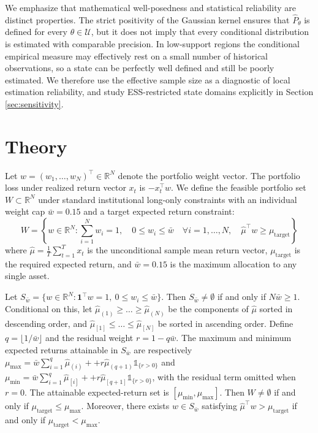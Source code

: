 \documentclass[smallcondensed]{svjour3}
\begin{document}
We emphasize that mathematical well-posedness and statistical reliability are
distinct properties. The strict positivity of the Gaussian kernel ensures that
$\widehat P_\theta$ is defined for every $\theta \in \mathcal{U}$, but it does
not imply that every conditional distribution is estimated with comparable
precision. In low-support regions the conditional empirical measure may
effectively rest on a small number of historical observations, so a state can be
perfectly well defined and still be poorly estimated. We therefore use the
effective sample size as a diagnostic of local estimation reliability, and study
ESS-restricted state domains explicitly in Section \ref{sec:sensitivity}.

\section{Theory}\label{sec:theory}
Let $w = (w_1, \dots, w_N)^\top \in \mathbb{R}^N$ denote the portfolio weight vector. The portfolio loss under realized return vector $x_t$ is $-x_t^\top w$. We define the feasible portfolio set $W \subset \mathbb{R}^N$ under standard institutional long-only constraints with an individual weight cap $\bar{w} = 0.15$ and a target expected return constraint:
\begin{equation}
    W = \left\{ w \in \mathbb{R}^N : \sum_{i=1}^N w_i = 1, \quad 0 \le w_i \le \bar{w} \quad \forall i=1,\dots,N, \quad \hat{\mu}^\top w \ge \mu_{\text{target}} \right\}
\end{equation}
where $\hat{\mu} = \frac{1}{T} \sum_{t=1}^T x_t$ is the unconditional sample mean return vector, $\mu_{\text{target}}$ is the required expected return, and $\bar{w} = 0.15$ is the maximum allocation to any single asset.

\begin{proposition}
Let $S_{\bar w}=\{w \in \mathbb{R}^N : \mathbf{1}^\top w=1,\ 0\leq w_i\leq\bar w\}$. Then $S_{\bar w}\neq\emptyset$ if and only if $N\bar w\geq 1$. Conditional on this, let $\hat{\mu}_{(1)} \ge \dots \ge \hat{\mu}_{(N)}$ be the components of $\hat{\mu}$ sorted in descending order, and $\hat{\mu}_{[1]} \le \dots \le \hat{\mu}_{[N]}$ be sorted in ascending order. Define $q = \lfloor 1/\bar{w} \rfloor$ and the residual weight $r = 1 - q \bar{w}$. The maximum and minimum expected returns attainable in $S_{\bar w}$ are respectively $\mu_{\max} = \bar{w} \sum_{i=1}^q \hat{\mu}_{(i)} + + r \hat{\mu}_{(q+1)} \mathbb{1}_{\{r>0\}}$ and $\mu_{\min} = \bar{w} \sum_{i=1}^q \hat{\mu}_{[i]} + + r \hat{\mu}_{[q+1]} \mathbb{1}_{\{r>0\}}$, with the residual term omitted when $r=0$. The attainable expected-return set is $[\mu_{\min}, \mu_{\max}]$. Then $W\neq\emptyset$ if and only if $\mu_{\mathrm{target}}\leq\mu_{\max}$. Moreover, there exists $w\in S_{\bar w}$ satisfying $\hat\mu^\top w>\mu_{\mathrm{target}}$ if and only if $\mu_{\mathrm{target}}<\mu_{\max}$.
\end{proposition}
\end{document}
